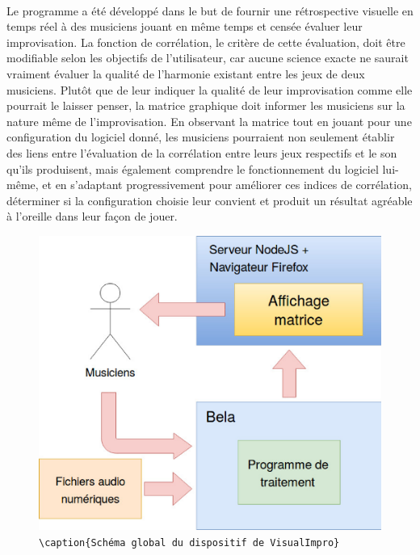 \paragraph{}
Le programme a été développé dans le but de fournir une rétrospective
visuelle en temps réel à des musiciens jouant en même temps et censée
évaluer leur improvisation. La fonction de corrélation, le critère de
cette évaluation, doit être modifiable selon les objectifs de
l'utilisateur, car aucune science exacte ne saurait vraiment évaluer
la qualité de l'harmonie existant entre les jeux de deux
musiciens. Plutôt que de leur indiquer la qualité de leur
improvisation comme elle pourrait le laisser penser, la matrice
graphique doit informer les musiciens sur la nature même de
l'improvisation. En observant la matrice tout en jouant pour une
configuration du logiciel donné, les musiciens pourraient non
seulement établir des liens entre l'évaluation de la corrélation entre
leurs jeux respectifs et le son qu'ils produisent, mais également
comprendre le fonctionnement du logiciel lui-même, et en s'adaptant
progressivement pour améliorer ces indices de corrélation, déterminer
si la configuration choisie leur convient et produit un résultat
agréable à l'oreille dans leur façon de jouer.

\begin{figure}[h]
 \centering
 \includegraphics[scale=0.5]{schemaglobal.png}
 \verb!\caption{Schéma global du dispositif de VisualImpro}!
 \label{schéma global}
\end{figure}

